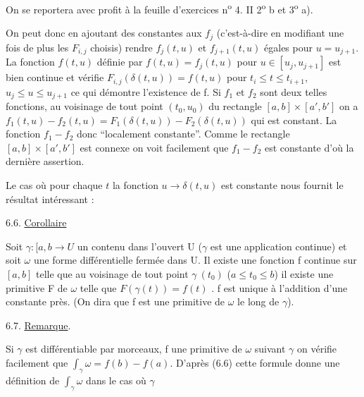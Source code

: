 
On se reportera avec profit à la feuille d'exercices n\textsuperscript{o} 4. II 2\textsuperscript{o} b \unsure{(}et 3\textsuperscript{o} a).

On peut donc en ajoutant des constantes aux $f_j$ (c'est-à-dire en
modifiant une fois de plus les $F_{i,j}$ choisis) rendre $f_j(t,u)$ et $f_{j+1}(t,u)$
égales pour $u = u_{j+1}$. La fonction $f(t,u)$ définie par $f(t,u) = f_j(t,u)$
pour $u \in [u_j, u_{j+1}]$ est bien continue et vérifie $F_{i,j}(\delta(t,u)) = f(t,u)$
pour $t_i \leq t \leq t_{i+1}$, $u_j \leq u \leq u_{j+1}$ ce qui démontre l'existence de f.
Si $f_1$ et $f_2$ sont deux telles fonctions, au voisinage de tout point $(t_0,u_0)$
du rectangle $[a,b] \times [a',b']$ on a
$f_1(t,u) - f_2(t,u) = F_1(\delta(t,u)) - F_2(\delta(t,u))$ qui est constant. La
fonction $f_1-f_2$  donc ``localement constante''. Comme le rectangle
$[a,b] \times [a',b']$ est connexe on voit facilement que $f_1-f_2$ est constante
d'où la dernière assertion.

Le cas où pour chaque $t$ la fonction $u \to \delta(t,u)$ est constante nous
fournit le résultat intéressant :

6.6. \uline{Corollaire}

Soit $\gamma : [a,b \to U$ un  contenu dans l'ouvert U ($\gamma$ est une
application continue) et soit $\omega$ une forme différentielle fermée dans U. Il
existe une fonction f continue sur $[a,b]$ telle que au voisinage de tout
point $\gamma\ (t_0)$ ($a \leq t_0 \leq b$) il existe une primitive F de $\omega$ telle que
$F(\gamma(t)) = f(t)$ . f est unique à l'addition d'une constante près.
(On dira que f est une primitive de $\omega$ le long de $\gamma$).

6.7. \uline{Remarque}.

Si $\gamma$ est différentiable par morceaux, f une primitive de $\omega$
suivant $\gamma$ on vérifie facilement que $\int_\gamma \omega = f(b) - f(a)$.
D'après (6.6) cette formule donne une définition de $\int_\gamma \omega$ dans le cas où $\gamma$

